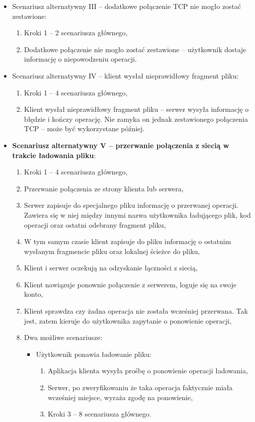 \documentclass[10pt,a4paper]{article}
\begin{document}
\begin{itemize}
    \item Scenariusz alternatywny III -- dodatkowe połączenie TCP nie mogło zostać zestawione:
    \begin{enumerate}
        \item Kroki 1 -- 2 scenariusza głównego,
        \item Dodatkowe połączenie nie mogło zostać zestawione -- użytkownik dostaje informację o niepowodzeniu operacji.
    \end{enumerate}

    \item Scenariusz alternatywny IV -- klient wysłał nieprawidłowy fragment pliku:
    \begin{enumerate}
        \item Kroki 1 -- 4 scenariusza głównego,
        \item Klient wysłał nieprawidłowy fragment pliku -- serwer wysyła informację o błędzie i kończy operację. Nie zamyka on jednak zestawionego połączenia TCP -- może być wykorzystane później.
    \end{enumerate}

    \item \textbf{Scenariusz alternatywny V -- przerwanie połączenia z siecią w trakcie ładowania pliku}:
    \begin{enumerate}
        \item Kroki 1 -- 4 scenariusza głównego,
        \item Przerwanie połączenia ze strony klienta lub serwera,
        \item Serwer zapisuje do specjalnego pliku informację o przerwanej operacji. Zawiera się w niej między innymi nazwa użytkownika ładującego plik, kod operacji oraz ostatni odebrany fragment pliku,
        \item W tym samym czasie klient zapisuje do pliku informację o ostatnim wysłanym fragmencie pliku oraz lokalnej ścieżce do pliku,
        \item Klient i serwer oczekują na odzyskanie łączności z siecią,
        \item Klient nawiązuje ponownie połączenie z serwerem, loguje się na swoje konto,
        \item Klient sprawdza czy żadna operacja nie została wcześniej przerwana. Tak jest, zatem kieruje do użytkownika zapytanie o ponowienie operacji,
        \item Dwa możliwe scenariusze:
        \begin{itemize}
            \item Użytkownik ponawia ładowanie pliku:
            \begin{enumerate}
                \item Aplikacja klienta wysyła prośbę o ponowienie operacji ładowania,
                \item Serwer, po zweryfikowaniu że taka operacja faktycznie miała wcześniej miejsce, wyraża zgodę na ponowienie,
                \item Kroki 3 -- 8 scenariusza głównego.
            \end{enumerate}


\end{itemize}
\end{enumerate}
\end{itemize}
\end{document}

